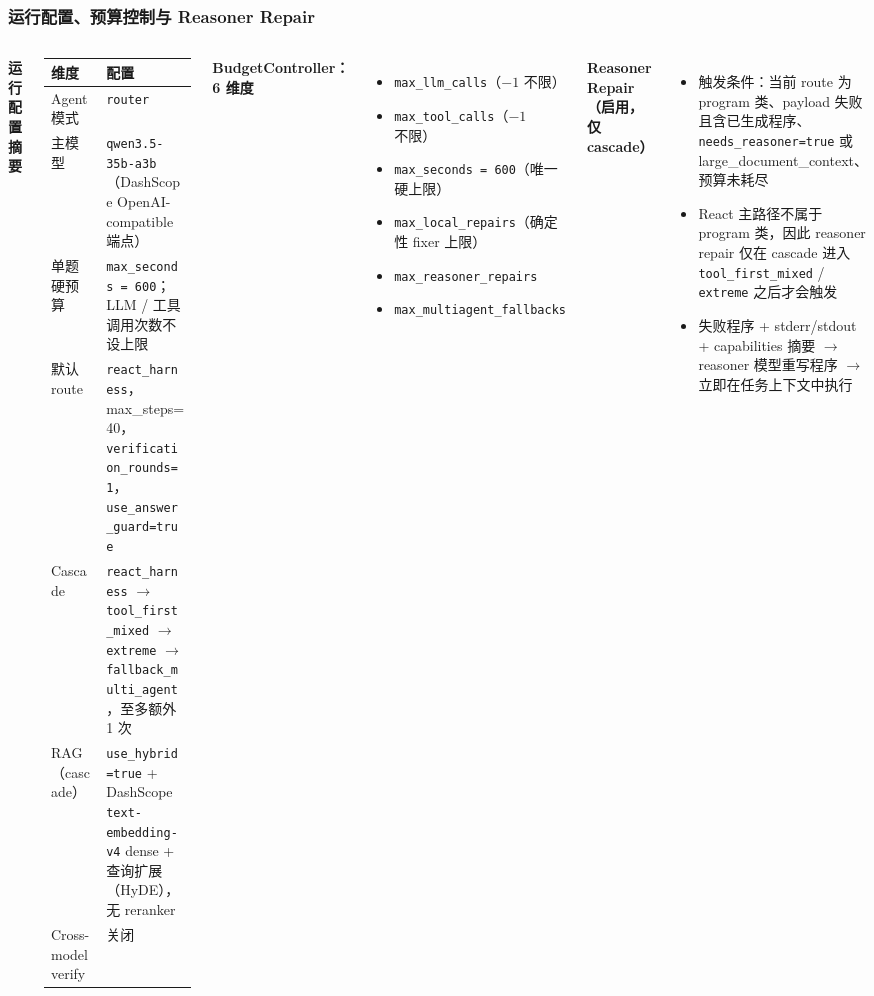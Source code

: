 \documentclass[11pt, aspectratio=169]{beamer}
\begin{document}
\begin{frame}[t]
\frametitle{运行配置、预算控制与 Reasoner Repair}

\vspace{-0.3em}
\footnotesize
\begin{columns}[T]

\textbf{运行配置摘要}
\vspace{0.2em}
\scriptsize
\begin{tabular}{@{}p{0.36\linewidth}p{0.6\linewidth}@{}}
\toprule
\textbf{维度} & \textbf{配置} \\
\midrule
Agent 模式 & \texttt{router} \\
主模型 & \texttt{qwen3.5-35b-a3b}（DashScope OpenAI-compatible 端点） \\
单题硬预算 & \texttt{max\_seconds = 600}；LLM / 工具调用次数不设上限 \\
默认 route & \texttt{react\_harness}，max\_steps=40，\texttt{verification\_rounds=1}，\texttt{use\_answer\_guard=true} \\
Cascade & \texttt{react\_harness} $\to$ \texttt{tool\_first\_mixed} $\to$ \texttt{extreme} $\to$ \texttt{fallback\_multi\_agent}，至多额外 1 次 \\
RAG（cascade）& \texttt{use\_hybrid=true} + DashScope \texttt{text-embedding-v4} dense + 查询扩展（HyDE），无 reranker \\
Cross-model verify & 关闭 \\
\bottomrule
\end{tabular}

\textbf{BudgetController：6 维度}
\begin{itemize}
    \setlength\itemsep{0.05em}
    \item \texttt{max\_llm\_calls}（$-1$ 不限）
    \item \texttt{max\_tool\_calls}（$-1$ 不限）
    \item \texttt{max\_seconds = 600}（唯一硬上限）
    \item \texttt{max\_local\_repairs}（确定性 fixer 上限）
    \item \texttt{max\_reasoner\_repairs}
    \item \texttt{max\_multiagent\_fallbacks}
\end{itemize}

\vspace{0.4em}
\textbf{Reasoner Repair（启用，仅 cascade）}
\begin{itemize}
    \setlength\itemsep{0.05em}
    \item 触发条件：当前 route 为 program 类、payload 失败且含已生成程序、\texttt{needs\_reasoner=true} 或 large\_document\_context、预算未耗尽
    \item React 主路径不属于 program 类，因此 reasoner repair 仅在 cascade 进入 \texttt{tool\_first\_mixed} / \texttt{extreme} 之后才会触发
    \item 失败程序 + stderr/stdout + capabilities 摘要 $\to$ reasoner 模型重写程序 $\to$ 立即在任务上下文中执行
\end{itemize}
\end{columns}

\end{frame}
\end{document}
